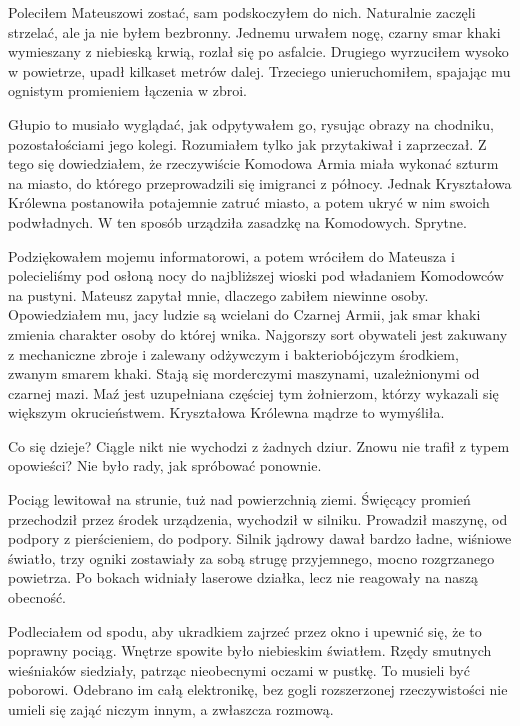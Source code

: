 Poleciłem Mateuszowi zostać, sam podskoczyłem do nich.
Naturalnie zaczęli strzelać, ale ja nie byłem bezbronny.
Jednemu urwałem nogę, czarny smar khaki wymieszany z niebieską krwią, rozlał się po asfalcie.
Drugiego wyrzuciłem wysoko w powietrze, upadł kilkaset metrów dalej. 
Trzeciego unieruchomiłem, spajając mu ognistym promieniem łączenia w zbroi.

Głupio to musiało wyglądać, jak odpytywałem go, rysując obrazy na chodniku, pozostałościami jego kolegi.
Rozumiałem tylko jak przytakiwał i zaprzeczał.
Z tego się dowiedziałem, że rzeczywiście Komodowa Armia miała wykonać szturm na miasto, do którego przeprowadzili się imigranci z północy.
Jednak Kryształowa Królewna postanowiła potajemnie zatruć miasto, a potem ukryć w nim swoich podwładnych.
W ten sposób urządziła zasadzkę na Komodowych. Sprytne.

Podziękowałem mojemu informatorowi, a potem wróciłem do Mateusza i polecieliśmy pod osłoną nocy do najbliższej wioski pod władaniem Komodowców na pustyni.
Mateusz zapytał mnie, dlaczego zabiłem niewinne osoby.
Opowiedziałem mu, jacy ludzie są wcielani do Czarnej Armii, jak smar khaki zmienia charakter osoby do której wnika.
Najgorszy sort obywateli jest zakuwany z mechaniczne zbroje i zalewany odżywczym i bakteriobójczym środkiem, zwanym smarem khaki.
Stają się morderczymi maszynami, uzależnionymi od czarnej mazi. Maź jest uzupełniana częściej tym żołnierzom, którzy wykazali się większym okrucieństwem.
Kryształowa Królewna mądrze to wymyśliła.

\divider{}

Co się dzieje? 
Ciągle nikt nie wychodzi z żadnych dziur.
Znowu nie trafił z typem opowieści?
Nie było rady, jak spróbować ponownie.

\divider{}

Pociąg lewitował na strunie, tuż nad powierzchnią ziemi.
Święcący promień przechodził przez środek urządzenia, wychodził w silniku.
Prowadził maszynę, od podpory z pierścieniem, do podpory.
Silnik jądrowy dawał bardzo ładne, wiśniowe światło, trzy ogniki zostawiały za sobą strugę przyjemnego, mocno rozgrzanego powietrza.
Po bokach widniały laserowe działka, lecz nie reagowały na naszą obecność.

Podleciałem od spodu, aby ukradkiem zajrzeć przez okno i upewnić się, że to poprawny pociąg.
Wnętrze spowite było niebieskim światłem.
Rzędy smutnych wieśniaków siedziały, patrząc nieobecnymi oczami w pustkę.
To musieli być poborowi.
Odebrano im całą elektronikę, bez gogli rozszerzonej rzeczywistości nie umieli się zająć niczym innym, a zwłaszcza rozmową.

